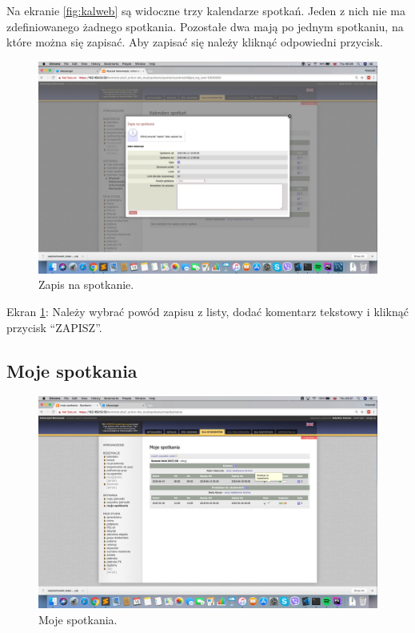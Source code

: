 \documentclass[licencjacka]{pracamgr}
\begin{document}
Na ekranie \ref{fig:kalweb} są widoczne trzy kalendarze spotkań. Jeden z nich nie ma zdefiniowanego żadnego spotkania. Pozostałe dwa mają po jednym spotkaniu, na które można się zapisać. Aby zapisać się należy kliknąć odpowiedni przycisk.

\begin{figure}[!]
  \includegraphics[width=\linewidth]{zapisUSOSweb.jpg}
  \caption{Zapis na spotkanie.}
  \label{fig:zapisweb}
\end{figure}

Ekran \ref{fig:zapisweb}: Należy wybrać powód zapisu z listy, dodać komentarz tekstowy i kliknąć przycisk \enquote{ZAPISZ}.

\subsection{Moje spotkania}

\begin{figure}[!]
  \includegraphics[width=\linewidth]{mojeSpotkaniaUSOSweb.jpg}
  \caption{Moje spotkania.}
  \label{fig:mojeweb}
\end{figure}
\end{document}
